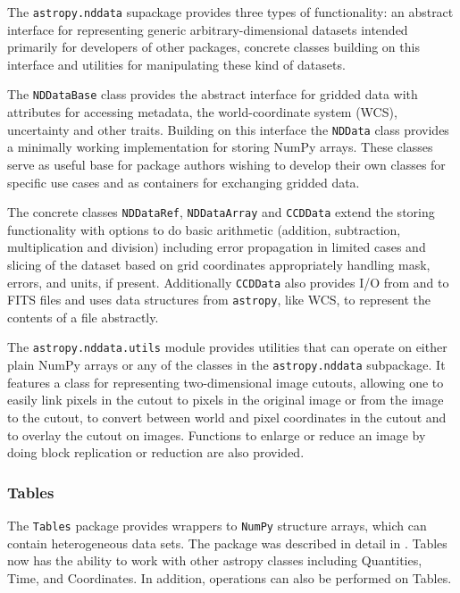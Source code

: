 \documentclass[modern]{aastex61}
\newcommand{\package}[1]{\texttt{#1}\xspace}
\newcommand{\astropypkg}{\package{astropy}}
\begin{document}
The \package{astropy.nddata} supackage provides three types of functionality:
an abstract interface for representing generic arbitrary-dimensional datasets
intended primarily for developers of other packages, concrete classes
building on this interface and utilities for manipulating these kind of
datasets.

The \texttt{NDDataBase} class provides the abstract interface for gridded data with attributes for accessing metadata, the world-coordinate system (WCS), uncertainty and other traits. Building on this interface the \texttt{NDData} class provides a minimally working implementation for storing NumPy arrays. These classes serve as useful base for package authors wishing to develop their own classes for specific use cases and as containers for exchanging gridded data.

The concrete classes \texttt{NDDataRef}, \texttt{NDDataArray} and \texttt{CCDData} extend the storing functionality with options to do basic arithmetic (addition, subtraction, multiplication and division) including error propagation in limited cases and slicing of the dataset based on grid coordinates appropriately handling mask, errors, and units, if present. Additionally \texttt{CCDData} also provides I/O from and to FITS files and uses data structures from \astropypkg, like WCS, to represent the contents of a file abstractly.

The \package{astropy.nddata.utils} module provides utilities that can operate on either plain NumPy arrays or any of the classes in the \package{astropy.nddata} subpackage.  It features a class for representing two-dimensional image cutouts, allowing one to easily link pixels in the cutout to pixels in the original image or from the image to the cutout, to convert between world and pixel coordinates in the cutout and to overlay the cutout on images. Functions to enlarge or reduce an image by doing block replication or reduction are also provided.



\subsubsection{Tables}
\label{sec:table}



The \package{Tables} package provides wrappers to \package{NumPy} structure arrays, which can contain heterogeneous data sets.   The package was described in detail in \cite{astropy}. Tables now has the ability to work with other astropy classes including Quantities, Time, and Coordinates.  In addition, operations can also be performed on Tables.
\end{document}
